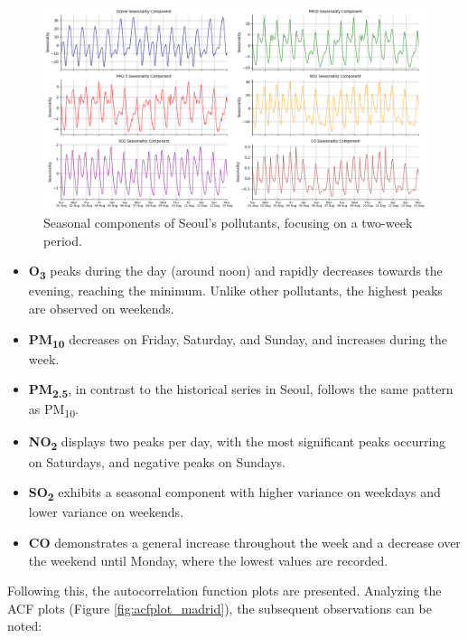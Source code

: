 \begin{figure}[h]
    \centering
    \includegraphics[width=1\linewidth]{images/madrid_seasonality.png}
    \caption{Seasonal components of Seoul's pollutants, focusing on a two-week period.}
    \label{fig:madrid_seasonality}
\end{figure}

\begin{itemize}
    \item \textbf{O\textsubscript{3}} peaks during the day (around noon) and rapidly decreases towards the evening, reaching the minimum. Unlike other pollutants, the highest peaks are observed on weekends.
    \item \textbf{PM\textsubscript{10}} decreases on Friday, Saturday, and Sunday, and increases during the week.
    \item \textbf{PM\textsubscript{2.5}}, in contrast to the historical series in Seoul, follows the same pattern as PM\textsubscript{10}.
    \item \textbf{NO\textsubscript{2}} displays two peaks per day, with the most significant peaks occurring on Saturdays, and negative peaks on Sundays.
    \item \textbf{SO\textsubscript{2}} exhibits a seasonal component with higher variance on weekdays and lower variance on weekends.
    \item \textbf{CO} demonstrates a general increase throughout the week and a decrease over the weekend until Monday, where the lowest values are recorded.
\end{itemize}

Following this, the autocorrelation function plots are presented. Analyzing the ACF plots (Figure \ref{fig:acfplot_madrid}), the subsequent observations can be noted:

